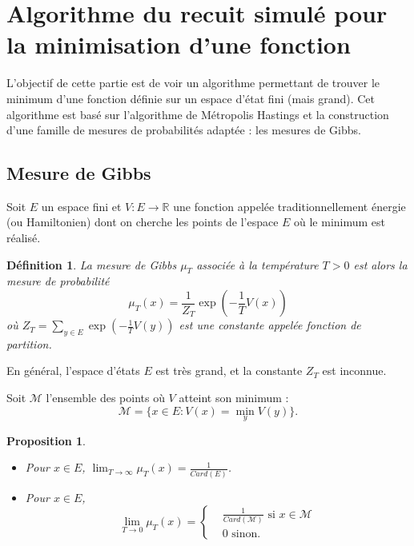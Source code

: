 \documentclass[a4paper,12pt]{book}
\newtheorem{defnfr}[thmfr]{Définition}
\newtheorem{propfr}[thmfr]{Proposition}
\begin{document}
\section{Algorithme du recuit simulé pour la minimisation d'une fonction}

L'objectif de cette partie est de voir un algorithme permettant de trouver le minimum d'une fonction définie sur un espace d'état fini (mais grand). Cet algorithme est basé sur l'algorithme de Métropolis Hastings et la construction d'une famille de mesures de probabilités adaptée : les mesures de Gibbs.

\subsection{Mesure de Gibbs}
Soit $E$ un espace fini et $V:E\to \mathbb{R}$ une fonction appelée traditionnellement énergie (ou Hamiltonien) dont on cherche les points de l'espace $E$ où le minimum est réalisé.

\begin{defnfr} La mesure de Gibbs $\mu_T$ associée à la température $T>0$ est alors la mesure de probabilité
$$\mu_T(x)=\frac{1}{Z_T}\exp\left(-\frac{1}{T}V(x)\right) $$
où $Z_T=\sum_{y\in E}\exp\left(-\frac{1}{T}V(y)\right)$ est une constante appelée fonction de partition.
\end{defnfr}
En général, l'espace d'états $E$ est très grand, et la constante $Z_T$ est inconnue.

Soit $\mathcal{M}$ l'ensemble des points où $V$ atteint son minimum : $$\mathcal{M}=\{x\in E : V(x)=\min_y V(y)\}.$$

\begin{propfr}
\begin{itemize}
\item[$i)$] Pour $x\in E$, $\displaystyle \lim_{T\to \infty} \mu_T(x)=\frac{1}{Card(E)}$.
\item[$ii)$] Pour $x\in E$,
$$ \lim_{T\to 0} \mu_T(x)=\left\{\begin{aligned}&\frac{1}{Card(\mathcal{M})}\text{ si }x\in \mathcal{M}\\
&0\text{ sinon.}\end{aligned}\right.$$
\end{itemize}
\end{propfr}
\end{document}
